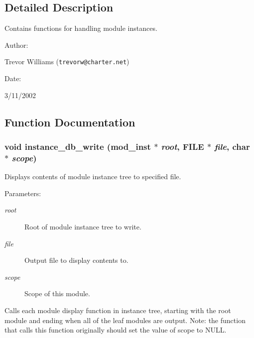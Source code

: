 \subsection{Detailed Description}
Contains functions for handling module instances.



\begin{Desc}
\item[Author: ]\par
Trevor Williams ({\tt trevorw@charter.net}) \end{Desc}
\begin{Desc}
\item[Date: ]\par
3/11/2002\end{Desc}


\subsection{Function Documentation}
\subsubsection{\setlength{\rightskip}{0pt plus 5cm}void instance\_\-db\_\-write ({\bf mod\_\-inst} $\ast$ {\em root}, FILE $\ast$ {\em file}, char $\ast$ {\em scope})}\label{instance_8h_a3}


Displays contents of module instance tree to specified file.

\begin{Desc}
\item[Parameters: ]\par
\begin{description}
\item[{\em 
root}]Root of module instance tree to write. \item[{\em 
file}]Output file to display contents to. \item[{\em 
scope}]Scope of this module.\end{description}
\end{Desc}
Calls each module display function in instance tree, starting with the root module and ending when all of the leaf modules are output. Note: the function that calls this function originally should set the value of scope to NULL. 
